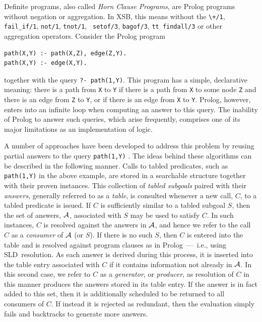 Definite programs, also called \emph{Horn Clause Programs}, are Prolog
programs without negation or aggregation.  In XSB, this means without
the \verb|\+/1|, {\tt fail\_if/1}, {\tt not/1}, {\tt tnot/1}, {\tt
  setof/3}, {\tt bagof/3}, {\tt tt findall/3} or other aggregation
operators.  Consider the Prolog program
\begin{center}
\begin{minipage}{3.8in}
\begin{verbatim}
path(X,Y) :- path(X,Z), edge(Z,Y).
path(X,Y) :- edge(X,Y).
\end{verbatim}						       
\end{minipage}
\end{center}
together with the query {\tt ?- path(1,Y)}.  This program has a
simple, declarative meaning: there is a path from {\tt X} to {\tt Y}
if there is a path from {\tt X} to some node {\tt Z} and there is an
edge from {\tt Z} to {\tt Y}, or if there is an edge from {\tt X} to
{\tt Y}\@.  Prolog, however, enters into an infinite loop when
computing an answer to this query.  The inability of Prolog to answer
such queries, which arise frequently, comprises one of its major
limitations as an implementation of logic.

A number of approaches have been developed to address this problem by
reusing partial answers to the query {\tt path(1,Y)}
\cite{Diet87,TaSa86,BMSU86,Viei89,Walk93}.  The ideas behind these
algorithms can be described in the following manner.  Calls to tabled
predicates, such as {\tt path(1,Y)} in the above example, are stored
in a searchable structure together with their proven instances.  This
collection of \emph{tabled subgoals} paired with their \emph{answers},
generally referred to as a \emph{table}, is consulted whenever a new
call, $C$, to a tabled predicate is issued.  If $C$ is sufficiently
similar to a tabled subgoal $S$, then the set of answers, ${\cal A}$,
associated with $S$ may be used to satisfy $C$.
In such instances, $C$ is resolved against the answers in ${\cal A}$, and
hence we refer to the call $C$ as a
\emph{consumer} of ${\cal A}$ (or $S$)\@.  If there
is no such $S$, then $C$ is entered into the table and is resolved
against program clauses as in Prolog~---~i.e., using SLD~resolution.
As each answer is derived during this process, it is inserted into the
table entry associated with $C$ if it contains information not already
in ${\cal A}$\@.  In this second case, we refer to $C$ as a
\emph{generator}, or \emph{producer}, as resolution of $C$ in this manner produces the answers
stored in its table entry.  If the answer is in fact added to this
set, then it is additionally scheduled to be returned to all consumers
of $C$\@.  If instead it is rejected as redundant, then the evaluation
simply fails and backtracks to generate more answers.

